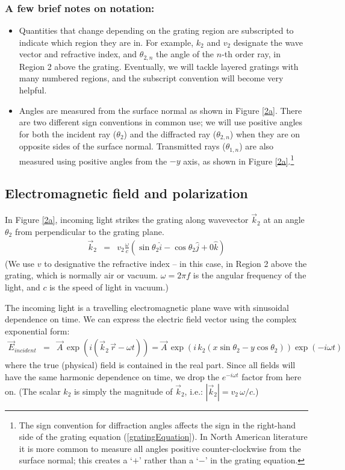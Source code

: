 \subsubsection{A few brief notes on notation:}
\begin{itemize}
\item Quantities that change depending on the grating region are subscripted to indicate which region they are in.  For example, $k_2$ and $v_2$ designate the wave vector and refractive index, and $\theta_{2,n}$ the angle of the $n$-th order ray, in Region 2 above the grating.  Eventually, we will tackle layered gratings with many numbered regions, and the subscript convention will become very helpful.
\item Angles are measured from the surface normal as shown in Figure \ref{2a}.  There are two different sign conventions in common use; we will use positive angles for both the incident ray ($\theta_2$) and the diffracted ray ($\theta_{2,n}$) when they are on opposite sides of the surface normal.  Transmitted rays ($\theta_{1,n}$) are also measured using positive angles from the $-y$ axis, as shown in Figure \ref{2a}.\footnote{The sign convention for diffraction angles affects the sign in the right-hand side of the grating equation (\ref{gratingEquation}).  In North American literature it is more common to measure all angles positive counter-clockwise from the surface normal; this creates a `$+$' rather than a `$-$' in the grating equation.}
\end{itemize}

\subsection{Electromagnetic field and polarization}
In Figure \ref{2a}, incoming light strikes the grating along wavevector $\vec k_2$ at an angle $\theta_2$ from perpendicular to the grating plane.
\begin{eqnarray}
\vec k_2 &=& v_2 \frac{\omega}{c} \left( \sin \theta_2 \hat i - \cos \theta_2 \hat j + 0 \hat k \right)
\end{eqnarray}
(We use $v$ to designative the refractive index -- in this case, in Region 2 above the grating, which is normally air or vacuum.  $\omega = 2\pi f$ is the angular frequency of the light, and $c$ is the speed of light in vacuum.)

The incoming light is a travelling electromagnetic plane wave with sinusoidal dependence on time.  We can express the electric field vector using the complex exponential form:
\begin{eqnarray}
\vec E_{incident} &=& \vec A\, \exp \left(i (\vec k_2 \,  \vec r - \omega t)\right)  = \vec A\, \exp \left(i\, k_2 (x \sin \theta_2 - y \cos \theta_2)\right)\exp \left(- i \omega t\right)
\end{eqnarray}
where the true (physical) field is contained in the real part.  Since all fields will have the same harmonic dependence on time, we drop the $e^{-i\omega t}$ factor from here on.  (The scalar $k_2$ is simply the magnitude of $\vec k_2$, i.e.: $\left| \vec k_2 \right| = v_2\, \omega/c$.)

